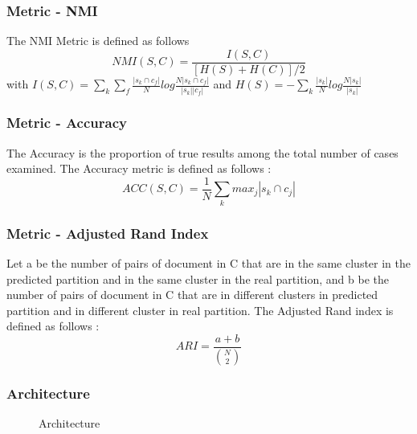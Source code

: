 \documentclass{beamer}
\begin{document}
\begin{frame}
\frametitle{Metric - NMI}
The NMI Metric is defined as follows
$$NMI(S,C) = \frac{I(S,C)}{[H(S)+H(C)]/2}$$ 
with
$I(S,C) =\sum_k \sum_f\frac{|s_k \cap c_f|}{N}log\frac{N|s_k \cap c_f|}{|s_k| |c_f|}$
and
$H(S) = -\sum_k\frac{|s_k|}{N}log\frac{N|s_k|}{|s_k|}$
\end{frame}

\begin{frame}
\frametitle{Metric - Accuracy}
The Accuracy is the proportion of true results among the total
  number of cases examined. The Accuracy metric is defined as follows :
$$ACC(S,C) = \frac{1}{N}\sum_k {max}_j|s_k \cap c_j|$$
\end{frame}

\begin{frame}
\frametitle{Metric - Adjusted Rand Index}
Let a be the number of pairs of document in C
  that are in the same cluster in the predicted partition and in the
  same cluster in the real partition, and b be the number of pairs of
  document in C that are in different clusters in predicted partition
  and in different cluster in real partition.
  The Adjusted Rand index is defined as follows :
  $$ARI = \frac{a+b}{\binom{N}{2}}$$
\end{frame}

\begin{frame}
\frametitle{Architecture}
\begin{figure}[!h]
  \centering
  \caption{\label{fig:archi}Architecture}
\end{figure}
\end{frame}
\end{document}
